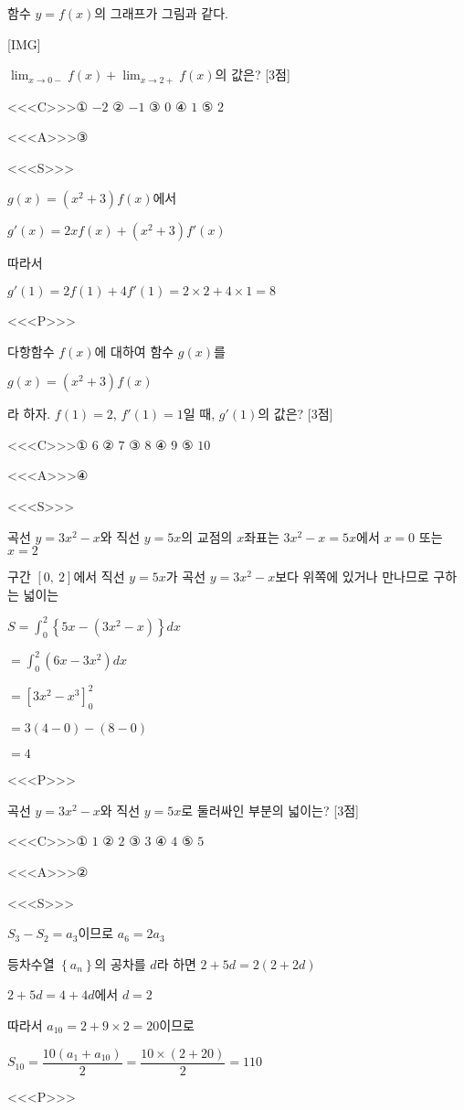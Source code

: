 \documentclass{oblivoir}
\begin{document}
함수 $y=f(x)$의 그래프가 그림과 같다.

[IMG]

$\displaystyle\lim_{x\to 0-}f(x)+\displaystyle\lim_{x\to 2+}f(x)$의 값은? [3점]

<<<C>>>① $-2$ ② $-1$ ③ $0$ ④ $1$ ⑤ $2$

<<<A>>>③

<<<S>>>

$g(x)=(x^{2}+3)f(x)$에서

$g'(x)= 2xf(x)+(x^{2}+3)f'(x)$

따라서

$g'(1)$$=2f(1)+4f'(1)$$= 2\times 2 + 4\times 1$$=8$

<<<P>>>

다항함수 $f(x)$에 대하여 함수 $g(x)$를

$g(x)=(x^{2}+3)f(x)$

라 하자. $f(1)=2$, $f'(1)=1$일 때, $g'(1)$의 값은? [3점]

<<<C>>>① $6$ ② $7$ ③ $8$ ④ $9$ ⑤ $10$

<<<A>>>④

<<<S>>>

곡선 $y=3x^{2}-x$와 직선 $y=5x$의 교점의 $x$좌표는 $3x^{2}-x=5x$에서 $x=0$ 또는 $x=2$

구간 $[0,\:2]$에서 직선 $y=5x$가 곡선 $y=3x^{2}-x$보다 위쪽에 있거나 만나므로 구하는 넓이는

$S=\displaystyle\int_{0}^{2}\left\{5x-(3x^{2}-x)\right\}dx$

$=\displaystyle\int_{0}^{2}(6x-3x^{2})dx$

$=\left[3x^{2}-x^{3}\right]_{0}^{2}$

$=3(4-0)-(8-0)$

$=4$

<<<P>>>

곡선 $y=3x^{2}-x$와 직선 $y=5x$로 둘러싸인 부분의 넓이는? [3점]

<<<C>>>① $1$ ② $2$ ③ $3$ ④ $4$ ⑤ $5$

<<<A>>>②

<<<S>>>

$S_{3}-S_{2}=a_{3}$이므로 $a_{6}= 2a_{3}$

등차수열 $\left\{a_{n}\right\}$의 공차를 $d$라 하면 $2+5d=2(2+2d)$

$2+5d=4+4d$에서 $d=2$

따라서 $a_{10}= 2+ 9\times 2 =20$이므로

$S_{10}$$=\dfrac{10(a_{1}+a_{10})}{2}$$=\dfrac{10\times(2+20)}{2}$$=110$

<<<P>>>
\end{document}
